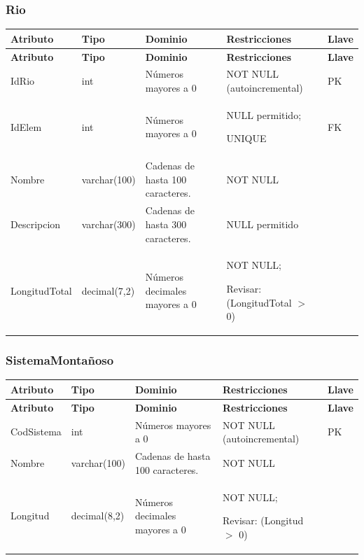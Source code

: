 \subsubsection*{Rio}

\begin{longtable}{p{2.6cm} p{2.2cm} p{5.8cm} p{4.2cm} p{1.5cm}}
\toprule
\textbf{Atributo} & \textbf{Tipo} & \textbf{Dominio} & \textbf{Restricciones} & \textbf{Llave} \\
\midrule
\endfirsthead

\toprule
\textbf{Atributo} & \textbf{Tipo} & \textbf{Dominio} & \textbf{Restricciones} & \textbf{Llave} \\
\midrule
\endhead

\bottomrule
\endfoot


IdRio
& int
& Números mayores a 0
& NOT NULL (autoincremental)
& PK \\

IdElem
& int
& Números mayores a 0
& NULL permitido;

UNIQUE
& FK \\

Nombre
& varchar(100)
& Cadenas de hasta 100 caracteres.
& NOT NULL
&  \\

Descripcion
& varchar(300)
& Cadenas de hasta 300 caracteres.
& NULL permitido
&  \\

LongitudTotal
& decimal(7,2)
& Números decimales mayores a 0
& NOT NULL;

Revisar: (LongitudTotal $>$ 0)
&  \\

\end{longtable}


\subsubsection*{SistemaMontañoso}

\begin{longtable}{p{2.2cm} p{2.2cm} p{5.8cm} p{4.2cm} p{1.5cm}}
\toprule
\textbf{Atributo} & \textbf{Tipo} & \textbf{Dominio} & \textbf{Restricciones} & \textbf{Llave} \\
\midrule
\endfirsthead

\toprule
\textbf{Atributo} & \textbf{Tipo} & \textbf{Dominio} & \textbf{Restricciones} & \textbf{Llave} \\
\midrule
\endhead

\bottomrule
\endfoot


CodSistema
& int
& Números mayores a 0
& NOT NULL (autoincremental)
& PK \\

Nombre
& varchar(100)
& Cadenas de hasta 100 caracteres.
& NOT NULL
&  \\

Longitud
& decimal(8,2)
& Números decimales mayores a 0
& NOT NULL;

Revisar: (Longitud $>$ 0)
&  \\

\end{longtable}


